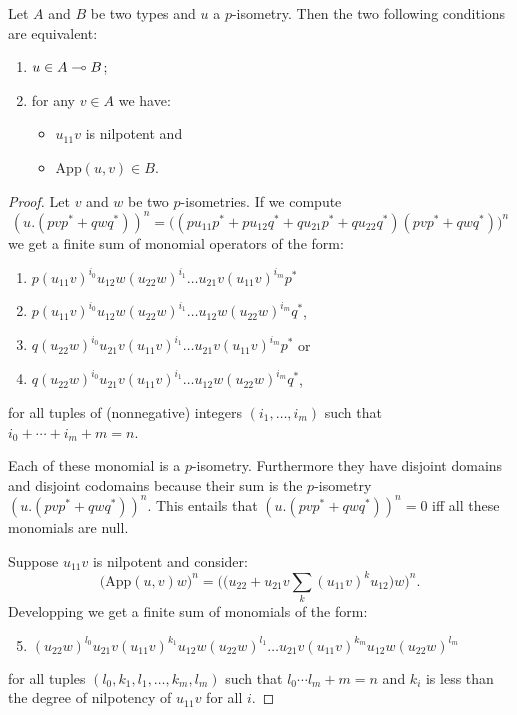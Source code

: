 \begin{theorem}
Let $A$ and $B$ be two types and $u$ a $p$-isometry. Then the two following conditions are equivalent:
\begin{enumerate}
\item $u\in A\multimap B$;
\item for any $v\in A$ we have:
  \begin{itemize}
  \item $u_{11}v$ is nilpotent and
  \item $\mathrm{App}(u, v)\in B$.
  \end{itemize}
\end{enumerate}
\end{theorem}

\begin{proof}
Let $v$ and $w$ be two $p$-isometries. If we compute
\begin{equation*}
(u.(pvp^* + qwq^*))^n = \bigl((pu_{11}p^* + pu_{12}q^* + qu_{21}p^* + qu_{22}q^*)(pvp^* + qwq^*)\bigr)^n
\end{equation*}
we get a finite sum of monomial operators of the form:
\begin{enumerate}
\item $p(u_{11}v)^{i_0}u_{12}w(u_{22}w)^{i_1}\dots u_{21}v(u_{11}v)^{i_m}p^*$
\item $p(u_{11}v)^{i_0}u_{12}w(u_{22}w)^{i_1}\dots u_{12}w(u_{22}w)^{i_m}q^*$,
\item $q(u_{22}w)^{i_0}u_{21}v(u_{11}v)^{i_1}\dots u_{21}v(u_{11}v)^{i_m}p^*$ or
\item $q(u_{22}w)^{i_0}u_{21}v(u_{11}v)^{i_1}\dots u_{12}w(u_{22}w)^{i_m}q^*$,
\end{enumerate}
for all tuples of (nonnegative) integers $(i_1,\dots, i_m)$ such that $i_0+\cdots+i_m+m = n$.

Each of these monomial is a $p$-isometry. Furthermore they have disjoint domains and disjoint codomains because their sum is the $p$-isometry $(u.(pvp^* + qwq^*))^n$. This entails that $(u.(pvp^* + qwq^*))^n = 0$ iff all these monomials are null.

Suppose $u_{11}v$ is nilpotent and consider:
\begin{equation*}
\bigl(\mathrm{App}(u,v)w\bigr)^n = \biggl(\bigl(u_{22} + u_{21}v\sum_k(u_{11}v)^k u_{12}\bigr)w\biggr)^n.
\end{equation*}
Developping we get a finite sum of monomials of the form:
\begin{enumerate}\setcounter{enumi}{4}
\item $(u_{22}w)^{l_0}u_{21}v(u_{11}v)^{k_1}u_{12}w(u_{22}w)^{l_1}\dots u_{21}v(u_{11}v)^{k_m}u_{12}w(u_{22}w)^{l_m}$
\end{enumerate}
for all tuples $(l_0, k_1, l_1,\dots, k_m, l_m)$ such that $l_0\cdots l_m + m = n$ and $k_i$ is less than the degree of nilpotency of $u_{11}v$ for all $i$.


\end{proof}

